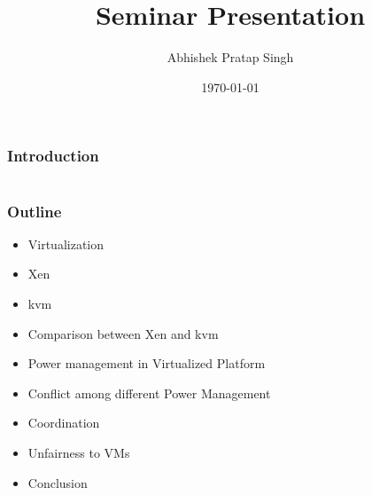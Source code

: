 \documentclass{beamer}
\title[Short title]{Seminar Presentation} %
\author{Abhishek Pratap Singh} %
\institute[IITB] %
{
Indian Institute Of Technology \\ %
\medskip
\textit{abhi1kush@gmail.com} %
}
\date{\today} %
\begin{document}
\begin{frame}
\titlepage %
\end{frame}

\begin{frame}
\frametitle{Introduction}
\begin{columns} %
\begin{column}{0.5\textwidth} %

\end{column}


\begin{column}{0.5\textwidth} %
\begin{center}
\end{center}
\end{column}
\end{columns}
\end{frame}

\begin{frame}
\frametitle{Outline}
\begin{itemize}
\item Virtualization %
\item Xen
\item kvm
\item Comparison between Xen and kvm
\item Power management in Virtualized Platform
\item Conflict among different Power Management
\item Coordination
\item Unfairness to VMs
\item Conclusion
\end{itemize} 
\end{frame}
\end{document}
